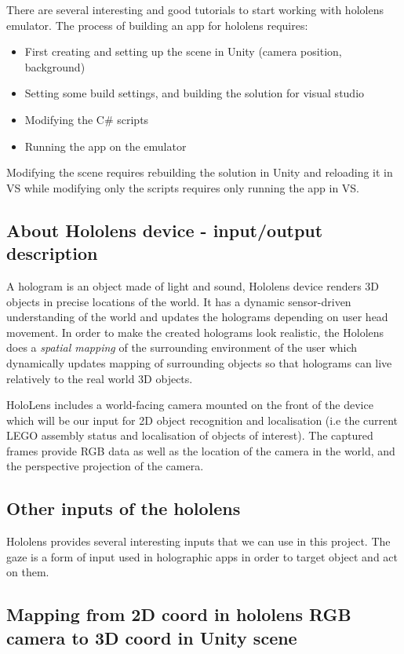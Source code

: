 \documentclass[a4paper,10pt]{article}
\begin{document}
There are several interesting and good tutorials to start working with hololens emulator. The process of building an app for hololens requires:
\begin{itemize}
	\item First creating and setting up the scene in Unity (camera position, background)
	\item Setting some build settings, and building the solution for visual studio
	\item Modifying the C\# scripts 
	\item Running the app on the emulator
\end{itemize}

Modifying the scene requires rebuilding the solution in Unity and reloading it in VS while modifying only the scripts requires only running the app in VS.

\subsection{About Hololens device - input/output description}

A hologram is an object made of light and sound, Hololens device renders 3D objects in precise locations of the world. It has a dynamic sensor-driven understanding of the world and updates the holograms depending on user head movement. In order to make the created holograms look realistic, the Hololens does a \emph{spatial mapping} of the surrounding environment of the user which dynamically updates mapping of surrounding objects so that holograms can live relatively to the real world 3D objects. 

HoloLens includes a world-facing camera mounted on the front of the device which will be our input for 2D object recognition and localisation (i.e the current LEGO assembly status and localisation of objects of interest). The captured frames provide RGB data as well as the location of the camera in the world, and the perspective projection of the camera. 

\subsection{Other inputs of the hololens}

Hololens provides several interesting inputs that we can use in this project. The gaze is a form of input used in holographic apps in order to target object and act on them. 


\subsection{Mapping from 2D coord in hololens RGB camera to 3D coord in Unity scene}
\end{document}
